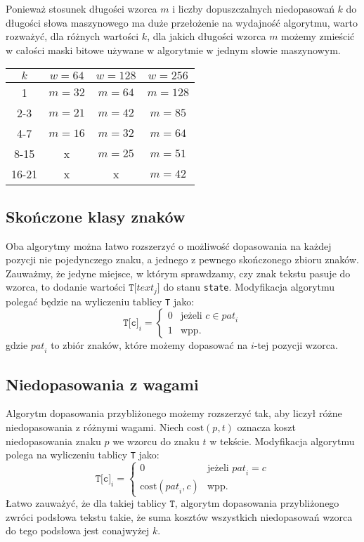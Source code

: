\documentclass{article}
\begin{document}
Ponieważ stosunek długości wzorca $m$ i liczby dopuszczalnych niedopasowań $k$ do długości słowa maszynowego ma duże przełożenie na wydajność algorytmu, warto rozważyć, dla różnych wartości $k$, dla jakich długości wzorca $m$ możemy zmieścić w całości maski bitowe używane w algorytmie w jednym słowie maszynowym. 
\begin{center}
    
\begin{tabular}{c|c|c|c}
    $k$ & $w=64$ & $w=128$ & $w=256$ \\
    \hline
    1 & $m=32$ & $m=64$ & $m=128$\\
    2-3 & $m=21$ & $m=42$ & $m=85$\\
    4-7 & $m=16$ & $m=32$ & $m=64$\\
    8-15 & x & $m=25$ & $m=51$ \\
    16-21 & x & x & $m=42$ \\ 
\end{tabular}

\end{center}

\subsection{Skończone klasy znaków}
Oba algorytmy można łatwo rozszerzyć o możliwość dopasowania na każdej pozycji nie pojedynczego znaku, a jednego z pewnego skończonego zbioru znaków.
Zauważmy, że jedyne miejsce, w którym sprawdzamy, czy znak tekstu pasuje do wzorca, to dodanie wartości $\texttt{T[}\textit{text}_j\texttt ]$ do stanu \texttt{state}.
Modyfikacja algorytmu polegać będzie na wyliczeniu tablicy \texttt{T} jako:
$$
\texttt{T[c]}_i = \begin{cases}
0&\text{jeżeli } c\in\textit{pat}_i\\
1&\text {wpp.}
\end{cases}
$$
gdzie $\textit{pat}_i$ to zbiór znaków, które możemy dopasować na $i$-tej pozycji wzorca. 

\subsection{Niedopasowania z wagami}
Algorytm dopasowania przybliżonego możemy rozszerzyć tak, aby liczył różne niedopasowania z różnymi wagami.
Niech $\text{cost}(p, t)$ oznacza koszt niedopasowania znaku $p$ we wzorcu do znaku $t$ w tekście.
Modyfikacja algorytmu polega na wyliczeniu tablicy \texttt{T} jako:
$$
\texttt{T[c]}_i = \begin{cases}
0&\text{jeżeli } \textit{pat}_i = c\\
\text{cost}(\textit{pat}_i, c)&\text {wpp.}
\end{cases}
$$
Łatwo zauważyć, że dla takiej tablicy $\texttt{T}$, algorytm dopasowania przybliżonego zwróci podsłowa tekstu takie, że suma kosztów wszystkich niedopasowań wzorca do tego podsłowa jest conajwyżej $k$.
\end{document}
